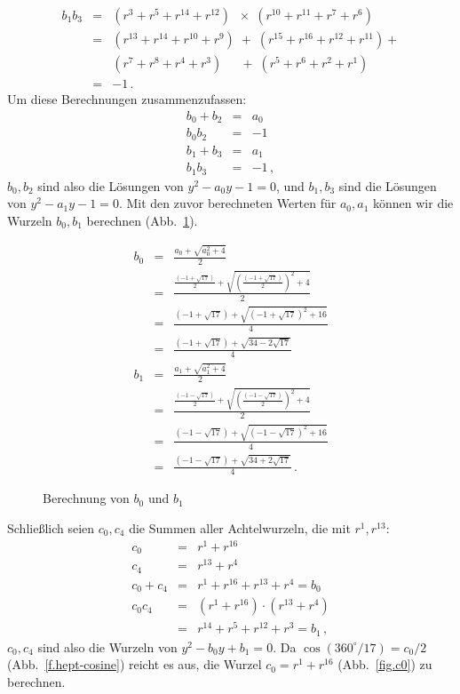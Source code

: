 \begin{eqnarray*}
b_1b_3&=&(r^3 + r^{5} + r^{14} +r^{12})\;\;\times\;(r^{10} + r^{11} + r^{7} +r^{6})\\
&=&(r^{13}+r^{14}+r^{10}+r^9)\;+\;(r^{15}+r^{16}+r^{12}+r^{11})+\\
&&(r^{7}+r^{8}+r^4+r^3)\quad\;\, +\;(r^{5}+r^{6}+r^{2}+r^1)\\
&=&-1\,.
\end{eqnarray*}
Um diese Berechnungen zusammenzufassen:
\begin{eqnarray*}
b_0+b_2&=&a_0\\
b_0b_2&=&-1\\
b_1+b_3&=&a_1\\
b_1b_3&=&-1\,,
\end{eqnarray*}
$b_0,b_2$ sind also die Lösungen von $y^2-a_0y-1= 0$, und $b_1,b_3$ sind die Lösungen von $y^2-a_1y-1 =0$. Mit den zuvor berechneten Werten für $a_0,a_1$ können wir die Wurzeln $b_0,b_1$ berechnen (Abb.~\ref{f.b0b1}).
\begin{figure}[t]
\begin{eqnarray*}
b_0&=&\frac{a_0+\sqrt{a_0^2+4}}{2}\\
&=&\frac{
     \displaystyle\frac{(-1+\sqrt{17})}{2} + 
     \sqrt{\left(\displaystyle\frac{(-1+\sqrt{17})}{2}\right)^2+4}
   }{2}\\
&=&\frac{
     (-1+\sqrt{17}) + 
     \sqrt{\left(-1+\sqrt{17}\right)^2+16}
   }{4}\\
&=&\frac{
     (-1+\sqrt{17}) + 
     \sqrt{34-2\sqrt{17}}
   }{4}\\
b_1&=&\frac{a_1+\sqrt{a_1^2+4}}{2}\\
&=&\frac{
     \displaystyle\frac{(-1-\sqrt{17})}{2} + 
     \sqrt{\left(\displaystyle\frac{(-1-\sqrt{17})}{2}\right)^2+4}
   }{2}\\
&=&\frac{
     (-1-\sqrt{17}) + 
     \sqrt{\left(-1-\sqrt{17}\right)^2+16}
   }{4}\\
&=&\frac{
     (-1-\sqrt{17}) + 
     \sqrt{34+2\sqrt{17}}
   }{4}\,.
\end{eqnarray*}
\caption{Berechnung von $b_0$ und $b_1$}\label{f.b0b1}
\end{figure}
Schließlich seien $c_0,c_4$ die Summen aller Achtelwurzeln, die mit $r^1,r^{13}$:
\begin{eqnarray*}
c_0&=&r^1+r^{16}\\
c_4&=&r^{13}+r^4\\
c_0+c_4&=&r^1+r^{16}+r^{13}+r^4=b_0\\
c_0c_4&=&(r^1+r^{16})\cdot(r^{13}+r^4)\\
&=&r^{14}+r^5+r^{12}+r^3=b_1\,,
\end{eqnarray*}
$c_0,c_4$ sind also die Wurzeln von $y^2-b_0y+b_1=0$. Da $\cos(360^\circ/17) = c_0/2$ (Abb.~\ref{f.hept-cosine}) reicht es aus, die Wurzel $c_0=r^1+r^{16}$ (Abb.~\ref{fig.c0}) zu berechnen.


